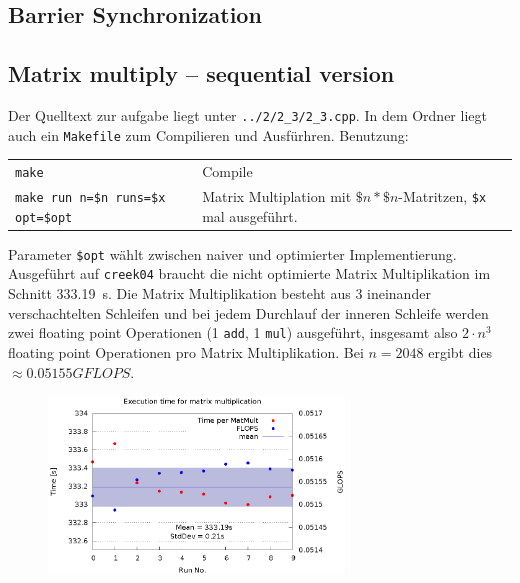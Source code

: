 \documentclass[a4paper,11pt]{scrartcl}
\begin{document}
\subsection{Barrier Synchronization}


\subsection{Matrix multiply – sequential version}

Der Quelltext zur aufgabe liegt unter \verb+../2/2_3/2_3.cpp+. In dem Ordner liegt auch ein \verb+Makefile+ zum Compilieren und Ausfürhren. Benutzung: 

\begin{table}[!ht]
    \begin{tabular}{ll}
    \verb+make+& Compile \\ 
    \verb+make run n=$n runs=$x opt=$opt+ & Matrix Multiplation mit $\$n*\$n$-Matritzen, \verb+$x+ mal ausgeführt. \\
    \end{tabular}
\end{table}
Parameter \verb+$opt+ wählt zwischen naiver und optimierter Implementierung.\\

Ausgeführt auf \verb+creek04+ braucht die nicht optimierte Matrix Multiplikation im Schnitt \SI{333.19}{\second}. Die Matrix Multiplikation besteht aus 3 ineinander verschachtelten Schleifen und bei jedem Durchlauf der inneren Schleife werden zwei floating point Operationen (1 \verb+add+, 1 \verb+mul+) ausgeführt, insgesamt also $2\cdot n^3$ floating point Operationen pro Matrix Multiplikation. Bei $n=2048$ ergibt dies $\approx 0.05155 GFLOPS$. 

\begin{figure}[!ht]
    \centering
    \includegraphics[width=0.7\textwidth,keepaspectratio]{2_3/data/matmult.eps}
\end{figure}
\end{document}
